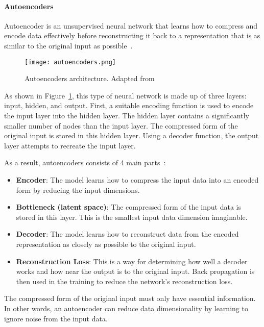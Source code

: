 \paragraph{Autoencoders}

Autoencoder is an unsupervised neural network that learns how to compress and encode data effectively before reconstructing it back to a representation that is as similar to the original input as possible~\cite{LopezPinaya2020Autoencoders}.

\begin{figure}[htbp]
    \centering
    \texttt{[image: autoencoders.png]}
    \caption{Autoencoders architecture. Adapted from~\cite{Madhavan2021DeepDeveloper}}
    \label{fig:autoencoders}
\end{figure}

As shown in Figure~\ref{fig:autoencoders}, this type of neural network is made up of three layers: input, hidden, and output. First, a suitable encoding function is used to encode the input layer into the hidden layer. The hidden layer contains a significantly smaller number of nodes than the input layer. The compressed form of the original input is stored in this hidden layer. Using a decoder function, the output layer attempts to recreate the input layer. 

As a result, autoencoders consists of 4 main parts~\cite{Abirami2020Energy-efficientSystem,LopezPinaya2020Autoencoders}:

\begin{itemize}
    \item \textbf{Encoder}: The model learns how to compress the input data into an encoded form by reducing the input dimensions.
    \item \textbf{Bottleneck (latent space)}: The compressed form of the input data is stored in this layer. This is the smallest input data dimension imaginable.
    \item \textbf{Decoder}: The model learns how to reconstruct data from the encoded representation as closely as possible to the original input.
    \item \textbf{Reconstruction Loss}: This is a way for determining how well a decoder works and how near the output is to the original input. Back propagation is then used in the training to reduce the network's reconstruction loss.
\end{itemize}

The compressed form of the original input must only have essential information. In other words, an autoencoder can reduce data dimensionality by learning to ignore noise from the input data. 

